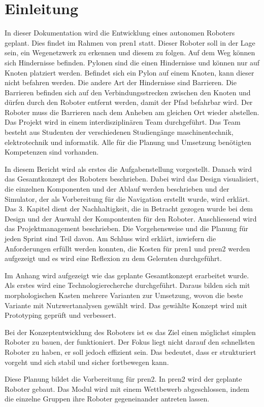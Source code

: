 \section{Einleitung}

In dieser Dokumentation wird die Entwicklung eines autonomen Roboters geplant. Dies findet im Rahmen von \acrfull{pren1} statt. Dieser Roboter soll in der Lage sein, ein Wegenetzwerk zu erkennen und diesem zu folgen. Auf dem Weg können sich Hindernisse befinden. Pylonen sind die einen Hindernisse und können nur auf Knoten platziert werden. Befindet sich ein Pylon auf einem Knoten, kann dieser nicht befahren werden. Die andere Art der Hindernisse sind Barrieren. Die Barrieren befinden sich auf den Verbindungsstrecken zwischen den Knoten und dürfen durch den Roboter entfernt werden, damit der Pfad befahrbar wird. Der Roboter muss die Barrieren nach dem Anheben am gleichen Ort wieder abstellen. 
Das Projekt wird in einem interdisziplinären Team durchgeführt. Das Team besteht aus Studenten der verschiedenen Studiengänge \acrfull{maschinentechnik}, \acrfull{elektrotechnik} und \acrfull{informatik}. Alle für die Planung und Umsetzung benötigten Kompetenzen sind vorhanden.

In diesem Bericht wird als erstes die Aufgabenstellung vorgestellt. Danach wird das Gesamtkonzept des Roboters beschrieben. Dabei wird das Design visualisiert, die einzelnen Komponenten und der Ablauf werden beschrieben und der Simulator, der als Vorbereitung für die Navigation erstellt wurde, wird erklärt. Das 3. Kapitel dient der Nachhaltigkeit, die in Betracht gezogen wurde bei dem Design und der Auswahl der Kompontenten für den Roboter. Anschliessend wird das Projektmanagement beschrieben. Die Vorgehensweise und die Planung für jeden Sprint sind Teil davon.
Am Schluss wird erklärt, inwiefern die Anforderungen erfüllt werden konnten, die Kosten für \acrfull{pren1} und \acrfull{pren2} werden aufgezeigt und es wird eine Reflexion zu dem Gelernten durchgeführt.

Im Anhang wird aufgezeigt wie das geplante Gesamtkonzept erarbeitet wurde. Als erstes wird eine Technologierecherche durchgeführt. Daraus bilden sich mit morphologischen Kasten mehrere Varianten zur Umsetzung, wovon die beste Variante mit Nutzwertanalysen gewählt wird. Das gewählte Konzept wird mit Prototyping geprüft und verbessert.

Bei der Konzeptentwicklung des Roboters ist es das Ziel einen möglichst simplen Roboter zu bauen, der funktioniert. Der Fokus liegt nicht darauf den schnellsten Roboter zu haben, er soll jedoch effizient sein. Das bedeutet, dass er strukturiert vorgeht und sich stabil und sicher fortbewegen kann.

Diese Planung bildet die Vorbereitung für \acrshort{pren2}. In \acrshort{pren2} wird der geplante Roboter gebaut. Das Modul wird mit einem Wettbewerb abgeschlossen, indem die einzelne Gruppen ihre Roboter gegeneinander antreten lassen.

